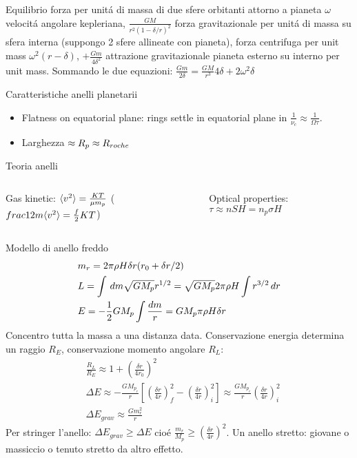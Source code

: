 \begin{wordonframe}{Equilibrio forza per unit\'a di massa di due sfere orbitanti attorno a pianeta}
$\omega$ velocit\'a angolare kepleriana, $\frac{GM}{r^2(1-\delta/r)^2}$ forza gravitazionale per unit\'a di massa su sfera interna (suppongo 2 sfere allineate con pianeta), forza centrifuga per unit mass $\omega^2(r-\delta)$, $+\frac{Gm}{4\delta^2}$ attrazione gravitazionale pianeta esterno su interno per unit mass.
Sommando le due equazioni: $\frac{Gm}{2\delta}=\frac{GM}{r^3}4\delta+2\omega^2\delta$
\end{wordonframe}

\begin{frame}{Caratteristiche anelli planetarii}
\begin{itemize}
\item Flatness on equatorial plane: rings settle in equatorial plane in $\frac{1}{\nu_c}\approx \frac{1}{\Omega\tau}$.
\item Larghezza $\approx R_p\approx R_{roche}{}$
\end{itemize}
\end{frame}

\begin{wordonframe}{Teoria anelli}
\begin{columns}[T]\begin{column}{0.5\textwidth}
Gas kinetic: $\langle v^2 \rangle=\frac{KT}{\mu m_p}$ ($\\frac{1}{2}m\langle v^2 \rangle=\frac{f}{2}KT$)
\end{column} \begin{column}{0.5\textwidth}
Optical properties: $\tau\approx nSH=n_p\sigma H$
\end{column}  \end{columns}
\end{wordonframe}

\begin{frame}{Modello di anello freddo}
\begin{align*}
&m_r=2\pi\rho H\delta r(r_0+\delta r/2)\\
&L=\int\,dm\sqrt{GM_p}r^{1/2}=\sqrt{GM_p}2\pi\rho H\int r^{3/2}\,dr\\
&E=-\frac{1}{2}GM_p\int \frac{dm}{r}=GM_p\pi\rho H \delta r
\end{align*}
Concentro tutta la massa a una distanza data. Conservazione energia determina un raggio $R_E$, conservazione momento angolare $R_L$:
\begin{align*}
&\frac{R_L}{R_E}\approx1+(\frac{\delta r}{4r_0})^2\\
&\Delta E\approx -\frac{GM_p_r}{r}[(\frac{\delta r}{4r})^2_f-(\frac{\delta r}{4r})^2_i]\approx\frac{GM_p_r}{r}(\frac{\delta r}{4r})^2_i\\
&\Delta E_{grav}\approx\frac{Gm_r^2}{r}
\end{align*}
Per stringer l'anello: $\Delta E_{grav}\geq\Delta E$ cio\'e $\frac{m_r}{M_p}\geq(\frac{\delta r}{4r})^2$.
Un anello stretto: giovane o massiccio o tenuto stretto da altro effetto.
\end{frame}

